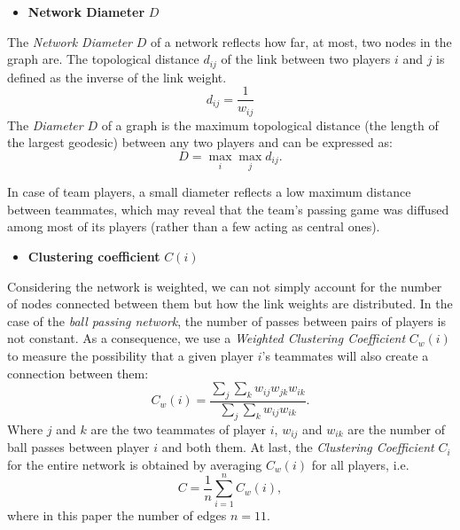 \documentclass[12pt]{article}  %
\newcommand{\upcite}[1]{\textsuperscript{\textsuperscript{\cite{#1}}}}
\begin{document}
\vspace{4pt}
\begin{itemize}
    \item \textbf{Network Diameter} $D$
\end{itemize}

The \textit{Network Diameter} $D$ of a network reflects how far, at most, two nodes in the graph are. 
The topological distance $d_{ij}$ of the link between two players $i$ and $j$ is defined as the inverse of the link weight. 
\begin{equation}\label{eq:topological_distance}
    d_{ij}=\frac{1}{w_{ij}}
\end{equation}
The \textit{Diameter} $D$ of a graph is the maximum topological distance\upcite{3} (the length of the largest geodesic) between any two players and can be expressed as:
\begin{equation}
    D=\max_i\max_j d_{ij}.
\end{equation}

In case of team players, a small diameter reflects a low maximum distance between teammates, which may reveal that the team's passing game was diffused among most of its players (rather than a few acting as central ones).

\vspace{4pt}
\begin{itemize}
    \item \textbf{Clustering coefficient} $C(i)$
\end{itemize}

Considering the network is weighted, we can not simply account for the number of nodes connected between them but how the link weights are distributed. In the case of the \textit{ball passing network}, the number of passes between pairs of players is not constant. As a consequence, we use a \textit{Weighted Clustering Coefficient}\upcite{4} $C_w(i)$ to measure the possibility that a given player $i$'s teammates will also create a connection between them:
\begin{equation}
    C_w(i)=\frac{\displaystyle\sum_{j}\sum_{k}w_{ij}w_{jk}w_{ik}}{\displaystyle\sum_{j}\sum_{k}w_{ij}w_{ik}}.
\end{equation}
Where $j$ and $k$ are the two teammates of player $i$, $w_{ij}$ and $w_{ik}$ are the number of ball passes between player $i$ and both them.
At last, the \textit{Clustering Coefficient} $C_i$ for the entire network is obtained by averaging $C_w(i)$ for all players, i.e.
\begin{equation}
    C=\frac{1}{n}\sum_{i=1}^{n} C_w(i),
\end{equation}
where in this paper the number of edges $n=11$.
\end{document}
